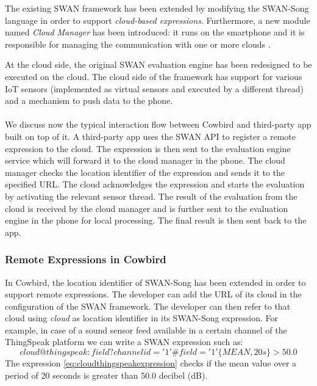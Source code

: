 The existing SWAN framework has been extended by modifying the SWAN-Song language in order to support \emph{cloud-based expressions}. Furthermore, a new module named \emph{Cloud Manager} has been introduced: it runs on the smartphone and it is responsible for managing the communication with one or more clouds \cite{cowbirdarticle}. 

At the cloud side, the original SWAN evaluation engine has been redesigned to be executed on the cloud. The cloud side of the framework has support for various IoT sensors (implemented as virtual sensors and executed by a different thread) and a mechanism to push data to the phone.

\paragraph{}
We discuss now the typical interaction flow between Cowbird and  third-party app built on top of it. A third-party app uses the SWAN API to register a remote expression to the cloud. The expression is then sent to the evaluation engine service which will forward it to the cloud manager in the phone. The cloud manager checks the location identifier of the expression and sends it to the specified URL. The cloud acknowledges the expression and starts the evaluation by activating the relevant sensor thread. The result of the evaluation from the cloud is received by the cloud manager and is further sent to the evaluation engine in the phone for local processing. The final result is then sent back to the app.

\subsubsection{Remote Expressions in Cowbird}
In Cowbird, the location identifier of SWAN-Song has been extended in order to support remote expressions. The developer can add the URL of its cloud in the configuration of the SWAN framework. The developer can then refer to that cloud using \emph{cloud} as location identifier in its SWAN-Song expression. For example, in case of a sound sensor feed available in a certain channel of the ThingSpeak platform \cite{thingspeakonline} we can write a SWAN expression such as:
\begin{equation} \label{eq:cloudthingspeakexpression}
cloud@thingspeak:field?channelid='1'\#field='1'\big\{MEAN,20s\big\} > 50.0
\end{equation}
The expression \ref{eq:cloudthingspeakexpression} checks if the mean value over a period of 20 seconds is greater than 50.0 decibel (dB). 

